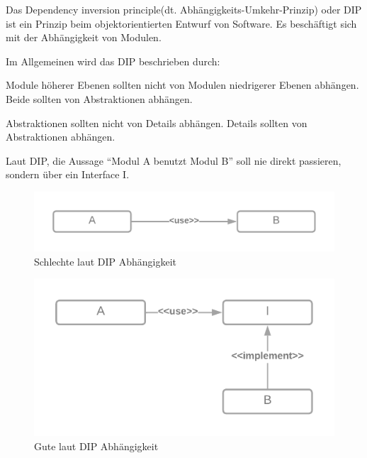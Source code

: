 Das Dependency inversion principle(dt. Abhängigkeits-Umkehr-Prinzip) oder DIP ist ein Prinzip 
beim objektorientierten Entwurf von Software. Es beschäftigt sich mit der Abhängigkeit von Modulen.

Im Allgemeinen wird das DIP beschrieben durch:

Module höherer Ebenen sollten nicht von Modulen niedrigerer Ebenen abhängen.
Beide sollten von Abstraktionen abhängen.


Abstraktionen sollten nicht von Details abhängen.
Details sollten von Abstraktionen abhängen.

Laut DIP, die Aussage ``Modul A benutzt Modul B'' soll nie direkt passieren, sondern über ein Interface I.

\begin{figure}[H]
    \centering
    \includegraphics[width=1\textwidth]{./images/DIP - bad.png}
    \caption[Schlechte laut DIP Abhängigkeit]{Schlechte laut DIP Abhängigkeit}
    \label{fig:MVP}
\end{figure}


\begin{figure}[H]
    \centering
    \includegraphics[width=1\textwidth]{./images/DIP - good.png}
    \caption[Gute laut DIP Abhängigkeit]{Gute laut DIP Abhängigkeit}
    \label{fig:MVP}
\end{figure}

